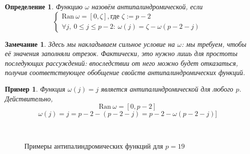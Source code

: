 \documentclass[14pt, a4paper, russian]{report}
\newtheorem{remark}{\indent Замечание}
\newtheorem{definition}{\indent Определение}
\newtheorem{example}{\indent Пример}
\begin{document}
\begin{definition}\label{antipalindromic}
Функцию $\omega$ назовём \emph{антипалиндромической}, если
\[\begin{cases}
	\mathrm{Ran }\ \omega = \left[0, \zeta\right], \text{где } \zeta := p-2 \\
	\forall j,\ 0 \le j \le p-2: \  \omega(j) = \zeta - \omega(p-2-j)
\end{cases}\]
\end{definition}
\begin{remark}
Здесь мы накладываем сильное условие на $\omega$: мы требуем, чтобы её значения заполняли отрезок. Фактически, это нужно лишь для простоты последующих рассуждений: впоследствии от него можно будет отказаться, получив соответствующее обобщение свойств антипалиндромических функций.
\end{remark}


\begin{example} \label{classic_omega}
Функция $\omega(j)=j$ является антипалиндромической для любого $p$. Действительно,
$$
\mathrm{Ran }\ \omega = \left[0, p-2\right]
$$
$$
\omega(j) = j = p-2 - (p-2-j) = p-2 - \omega(p-2-j)]
$$
\end{example}

\begin{figure}[!h]
    \\
    \caption{\small Примеры антипалиндромических функций для $p=19$}
\label{fig:antipalindromic}
\end{figure}
\end{document}

